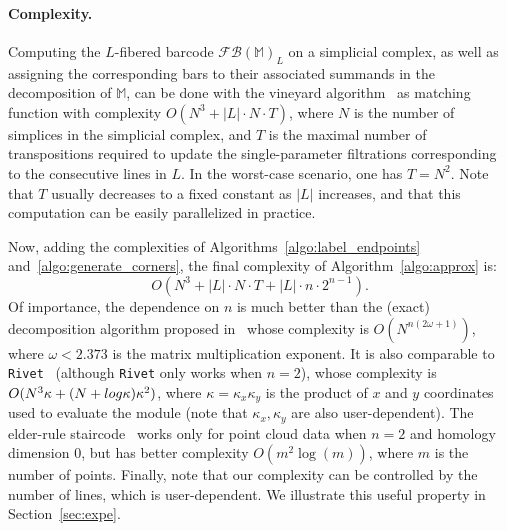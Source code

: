 \documentclass{article}
\newcommand{\fibered}[1]{ {\mathcal F}{\mathcal B}(#1) }
\newcommand{\Mbb}{\mathbb{M}}
\newcommand{\RIVET}{\texttt{Rivet}}
\begin{document}
\paragraph*{Complexity.} Computing the $L$-fibered barcode $\fibered{\Mbb}_L$ on a simplicial complex, as well as assigning the corresponding bars to their associated
summands in the decomposition of $\Mbb$, can be done with the vineyard algorithm~\cite{cohen-steinerVinesVineyardsUpdating2006} as matching function with complexity
$O(N^3 + |L|\cdot N \cdot T)$, where $N$ is the number of simplices in the simplicial complex, and $T$ is the maximal number of transpositions required to update the
single-parameter filtrations corresponding to the consecutive lines in $L$. In the worst-case scenario, one has $T=N^2$.
Note that $T$ usually decreases to a fixed constant as $|L|$ increases, and that this computation can be easily parallelized in practice.

Now, adding the complexities
of Algorithms~\ref{algo:label_endpoints} and~\ref{algo:generate_corners},
the final complexity of Algorithm~\ref{algo:approx} is:
\begin{equation}\label{eq:MMA_complexity}
	O(N^3 + |L| \cdot N \cdot T  + |L|  \cdot n \cdot 2^{n-1}).
\end{equation}
Of importance, the dependence on $n$ is much better than the (exact) decomposition algorithm proposed in~\cite{deyGeneralizedPersistenceAlgorithm2022, deyDecomposingMultiparameterPersistence2025}
whose complexity is $O(N^{n(2\omega +1)})$, where $\omega < 2.373$ is the matrix
multiplication exponent.
It is also comparable
to \RIVET~\cite{lesnickInteractiveVisualization2D2015} (although \RIVET{} only works when $n=2$),
whose complexity is $O(N^3\kappa + (N+{\rm log}\kappa)\kappa^2)$,
where $\kappa=\kappa_x\kappa_y$ is the product of $x$ and $y$ coordinates used to evaluate the module
(note that $\kappa_x,\kappa_y$ are also user-dependent).
The elder-rule staircode~\cite{caiElderRuleStaircodesAugmentedMetric2021}
works only for point cloud data when $n=2$ and homology dimension $0$, but
has better complexity $O(m^2\log(m))$, where $m$ is the number of points.
Finally, note that our complexity
can be controlled by the number of lines, which is user-dependent. We illustrate this useful property in Section~\ref{sec:expe}. \\
\end{document}
